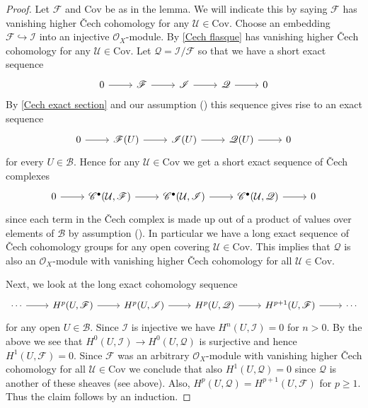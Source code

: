 \begin{proof}
Let $\mathscr{F}$ and $\mathrm{Cov}$ be as in the lemma. We will indicate this by saying $\mathscr{F}$ has vanishing higher \v{C}ech cohomology for any $\mathcal{U}\in\mathrm{Cov}$. Choose an embedding $\mathscr{F}\hookrightarrow\mathscr{I}$ into an injective $\mathscr{O}_X$-module. By \cref{Cech flasque} has vanishing higher \v{C}ech cohomology for any $\mathcal{U}\in\mathrm{Cov}$. Let $\mathscr{Q}=\mathscr{I}/\mathscr{F}$ so that we have a short exact sequence
\[\begin{tikzcd}
0\ar[r]&\mathscr{F}\ar[r]&\mathscr{I}\ar[r]&\mathscr{Q}\ar[r]&0
\end{tikzcd}\]
By \cref{Cech exact section} and our assumption () this sequence gives rise to an exact sequence
\[\begin{tikzcd}
0\ar[r]&\mathscr{F}(U)\ar[r]&\mathscr{I}(U)\ar[r]&\mathscr{Q}(U)\ar[r]&0
\end{tikzcd}\]
for every $U\in\mathcal{B}$. Hence for any $\mathcal{U}\in\mathrm{Cov}$ we get a short exact sequence of \v{C}ech complexes
\[\begin{tikzcd}
0\ar[r]&\mathscr{C}^\bullet(\mathcal{U},\mathscr{F})\ar[r]&\mathscr{C}^\bullet(\mathcal{U},\mathscr{I})\ar[r]&\mathscr{C}^\bullet(\mathcal{U},\mathscr{Q})\ar[r]&0
\end{tikzcd}\]
since each term in the \v{C}ech complex is made up out of a product of values over elements of $\mathcal{B}$ by assumption (). In particular we have a long exact sequence of \v{C}ech cohomology groups for any open covering $\mathcal{U}\in\mathrm{Cov}$. This implies that $\mathscr{Q}$ is also an $\mathscr{O}_X$-module with vanishing higher \v{C}ech cohomology for all $\mathcal{U}\in\mathrm{Cov}$.\par
Next, we look at the long exact cohomology sequence
\[\begin{tikzcd}
\cdots\ar[r]&H^p(U,\mathscr{F})\ar[r]&H^p(U,\mathscr{I})\ar[r]&H^p(U,\mathscr{Q})\ar[r]&H^{p+1}(U,\mathscr{F})\ar[r]&\cdots
\end{tikzcd}\]
for any open $U\in\mathcal{B}$. Since $\mathscr{I}$ is injective we have $H^n(U,\mathscr{I})=0$ for $n>0$. By the above we see that $H^0(U,\mathscr{I})\to H^0(U,\mathscr{Q})$ is surjective and hence $H^1(U,\mathscr{F})=0$. Since $\mathscr{F}$ was an arbitrary $\mathscr{O}_X$-module with vanishing higher \v{C}ech cohomology for all $\mathcal{U}\in\mathrm{Cov}$ we conclude that also $H^1(U,\mathscr{Q})=0$ since $\mathscr{Q}$ is another of these sheaves (see above). Also, $H^p(U,\mathscr{Q})=H^{p+1}(U,\mathscr{F})$ for $p\geq 1$. Thus the claim follows by an induction.
\end{proof}
